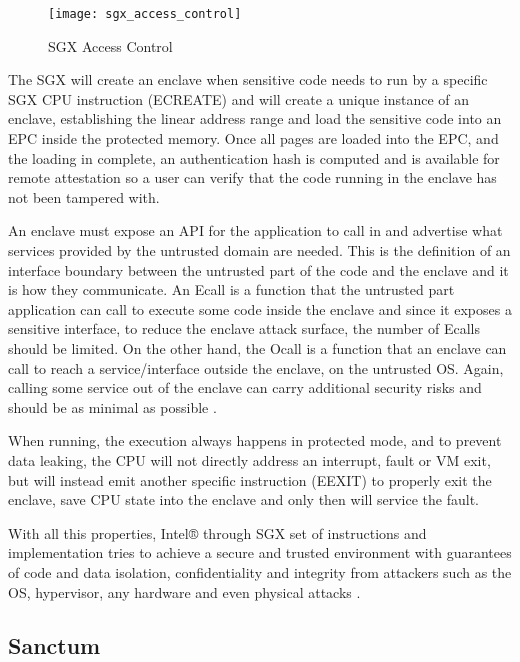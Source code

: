 \begin{figure}[htbp]
	\centering
	{\texttt{[image: sgx\_access\_control]}}%
	\caption{\gls{SGX} Access Control \cite{sgx:4}}
	\label{fig:sgx_access_control}
\end{figure}

The \gls{SGX} will create an enclave when sensitive code needs to run by a specific \gls{SGX} CPU instruction (ECREATE) and will create a unique instance of an enclave, establishing the linear address range and load the sensitive code into an \gls{EPC} inside the protected memory. Once all pages are loaded into the EPC, and the loading in complete, an authentication hash is computed and is available for remote attestation so a user can verify that the code running in the enclave has not been tampered with.

An enclave must expose an \gls{API} for the application to call in and advertise what services provided by the untrusted domain are needed. This is the definition of an interface boundary between the untrusted part of the code and the enclave and it is how they communicate. An \gls{Ecall} is a function that the untrusted part application can call to execute some code inside the enclave and since it exposes a sensitive interface, to reduce the enclave attack surface, the number of \glspl{Ecall} should be limited. On the other hand, the \gls{Ocall} is a function that an enclave can call to reach a service/interface outside the enclave, on the untrusted \gls{OS}. Again, calling some service out of the enclave can carry additional security risks and should be as minimal as possible \cite{sgx:6}.

When running, the execution always happens in protected mode, and to prevent data leaking, the CPU will not directly address an interrupt, fault or VM exit, but will instead emit another specific instruction (EEXIT) to properly exit the enclave, save CPU state into the enclave and only then will service the fault.

With all this properties, Intel® through \gls{SGX} set of instructions and implementation tries to achieve a secure and trusted environment with guarantees of code and data isolation, confidentiality and integrity from attackers such as the \gls{OS}, hypervisor, any hardware and even physical attacks \cite{cryptoeprint:2016:086}.

\subsection{Sanctum} %
\label{ssec:sanctum}

